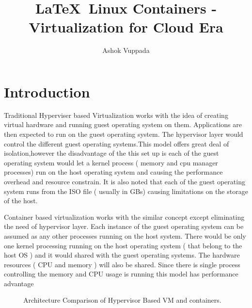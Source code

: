 \documentclass[9pt,twocolumn,twoside]{styles/osajnl}
\title{\LaTeX\ Linux Containers - Virtualization for  Cloud Era}
\author[1]{Ashok Vuppada}
\affil[1]{School of Informatics and Computing, Bloomington, IN 47408, U.S.A.}
\affil[*]{Corresponding authors: ashokmadhu66@gmail.com}
\begin{document}
\maketitle

\section{Introduction}

Traditional Hyperviser based Virtualization works with the idea of
creating virtual hardware and running guest operating system on
them. Applications are then expected to run on the guest operating
system. The hypervisor layer would control the different guest
operating systems.This model offers great deal of isolation,however
the disadvantage of the this set up is each of the guest operating
system would let a kernel process ( memory and cpu manager processes)
run on the host operating system and causing the performance overhead
and resource constrain. It is also noted that each of the guest
operating system runs from the ISO file ( usually in GBs) causing
limitations on the storage of the host. \cite{www-slashroot} 

Container based virtualization works with the similar concept except
eliminating the need of hypervisor layer. Each instance of the guest
operating system can be assumed as any other processes running on the
host system. There would be only one kernel processing running on the
host operating system ( that belong to the host OS ) and it would
shared with the guest operating systems. The hardware resources ( CPU
and memory ) will also be shared. Since there is single process
controlling the memory and CPU usage is running this model has
performance advantage \cite{www-slashroot}

\begin{figure}[htbp]
\centering
{}
\caption{Architecture Comparison of Hypervisor Based VM and containers.}
\label{fig:false-color}
\end{figure}
\end{document}
